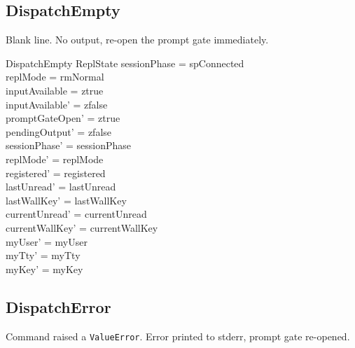 \documentclass[a4paper,10pt,fleqn]{article}
\begin{document}
\subsection{DispatchEmpty}

Blank line.  No output, re-open the prompt gate immediately.

\begin{schema}{DispatchEmpty}
  \Delta ReplState
\where
  sessionPhase = spConnected \\
  replMode = rmNormal \\
  inputAvailable = ztrue \\
  inputAvailable' = zfalse \\
  promptGateOpen' = ztrue \\
  pendingOutput' = zfalse \\
  sessionPhase' = sessionPhase \\
  replMode' = replMode \\
  registered' = registered \\
  lastUnread' = lastUnread \\
  lastWallKey' = lastWallKey \\
  currentUnread' = currentUnread \\
  currentWallKey' = currentWallKey \\
  myUser' = myUser \\
  myTty' = myTty \\
  myKey' = myKey
\end{schema}

\subsection{DispatchError}

Command raised a \texttt{ValueError}.  Error printed to stderr,
prompt gate re-opened.
\end{document}
